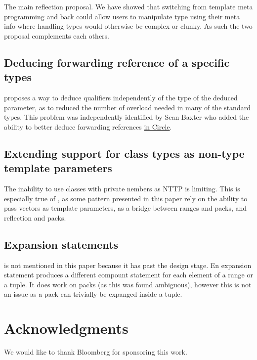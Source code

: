 \documentclass{wg21}
\begin{document}
The main reflection proposal. We have showed that switching from template meta programming and back could allow users to manipulate type using their meta info where handling types would otherwise be complex or clunky. As such the two proposal complements each others.

\subsection{ Deducing forwarding reference of a specific types}

 proposes a way to deduce qualifiers independently of the type of the deduced parameter, as to reduced the number of overload needed in many of the standard types.
This problem was independently identified by Sean Baxter who added the ability to better deduce forwarding references \href{https://github.com/seanbaxter/circle/tree/master/tuple#deduced-forward-references}{in Circle}.

\subsection{ Extending support for class types as non-type template parameters}

The inability to use classes with private nembers as NTTP is limiting.
This is especially true of , as some pattern presented in this paper rely on the ability to pass vectors as template parameters,
as a bridge between ranges and packs, and reflection and packs.

\subsection{ Expansion statements}

 is not mentioned in this paper because it has past the design stage.
En expansion statement produces a different compount statement for each element of a range or a tuple.
It does work on packs (as this was found ambiguous), however this is not an issue as a pack can trivially be expanged inside a tuple.


\section{Acknowledgments}

We would like to thank Bloomberg for sponsoring this work.\\
\end{document}
